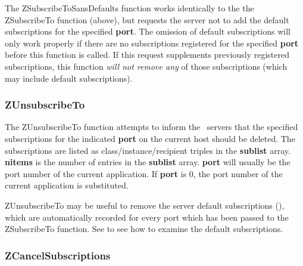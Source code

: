 \etemplate
{}

The ZSubscribeToSansDefaults function works identically to the the
ZSubscribeTo function (above), but requests the server not to add the default
subscriptions for the specified {\bf port}.  The omission of default
subscriptions will only work properly if there are no subscriptions
registered for the specified {\bf port} before this function is called.
If this request supplements previously registered subscriptions, this
function {\em will not remove any} of those subscriptions (which may
include default subscriptions).

\subsubsection{ZUnsubscribeTo}
\label{ZUnsubscribeTo}

\etemplate
{}

The ZUnsubscribeTo function attempts to inform the \Zephyr\ servers
that the specified subscriptions for the indicated {\bf port} on the
current host should be deleted.  The subscriptions are listed as
class/instance/recipient triples in the {\bf sublist} array.
{\bf nitems} is the number of entries in the {\bf sublist} array.
{\bf port} will usually be the port number of the current application.
If {\bf port} is 0, the port number of the current application is substituted.

ZUnsubscribeTo may be useful to remove the server default subscriptions
(),
which are automatically recorded for every port which has been passed to
the ZSubscribeTo function.  See  to
see how to examine the default subscriptions.

\subsubsection{ZCancelSubscriptions}
\label{ZCancelSubscriptions}

